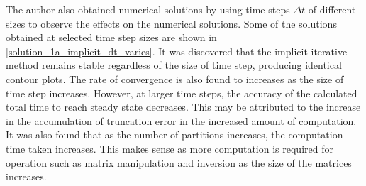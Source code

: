 \documentclass[a4paper]{article}
\begin{document}
		The author also obtained numerical solutions by using time steps $\Delta t$ of different sizes to observe the effects on the numerical solutions. Some of the solutions obtained at selected time step sizes are shown in \autoref{solution_1a_implicit_dt_varies}. It was discovered that the implicit iterative method remains stable regardless of the size of time step, producing identical contour plots. The rate of convergence is also found to increases as the size of time step increases. However, at larger time steps, the accuracy of the calculated total time to reach steady state decreases. This may be attributed to the increase in the accumulation of truncation error in the increased amount of computation. It was also found that as the number of partitions increases, the computation time taken increases. This makes sense as more computation is required for operation such as matrix manipulation and inversion as the size of the matrices increases.
\end{document}
